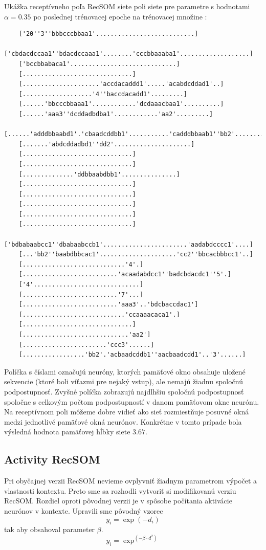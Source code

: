 Ukážka receptívneho poľa RecSOM siete poli siete pre parametre s hodnotami $\alpha = 0.35$ po poslednej trénovacej epoche na trénovacej množine :

\begin{lstlisting}
    ['20''3''bbbcccbbaa1'...........................]
    ['cbdacdccaa1''bdacdccaaa1'........'cccbbaaaba1'...................]
    ['bccbbabaca1'.............................]
    [..............................]
    [.....................'accdacaddd1'.....'acabdcddad1'..]
    [...................'4''baccdacadd1'.........]
    [......'bbcccbbaaa1'............'dcdaaacbaa1'..........]
    [......'aaa3''dcddadbdba1'............'aa2'.........]
    [......'adddbbaabd1'.'cbaadcddbb1'...........'cadddbbaab1''bb2'........]
    [.......'abdcddadbd1''dd2'.....................]
    [..............................]
    [..............................]
    [..............'ddbbaabdbb1'...............]
    [..............................]
    [..............................]
    [..............................]
    [..............................]
    [..............................]
    ['bdbabaabcc1''dbabaabccb1'.......................'aadabdcccc1'....]
    [...'bb2''baabdbbcac1'.....................'cc2''bbcacbbbcc1'..]
    [............................'4'.]
    [..........................'acaadabdcc1''badcbdacdc1''5'.]
    ['4'.............................]
    [..........................'7'...]
    [..........................'aaa3'..'bdcbaccdac1']
    [............................'ccaaaacaca1'.]
    [..............................]
    [.............................'aa2']
    [.......................'ccc3'......]
    [.................'bb2'.'acbaadcddb1''aacbaadcdd1'..'3'......]
\end{lstlisting}

Políčka s číslami označujú neuróny, ktorých pamäťové okno obsahuje uložené sekvencie (ktoré boli víťazmi pre nejaký vstup), ale nemajú žiadnu 
spoločnú podpostupnosť.
Zvyšné políčka zobrazujú najdlhšiu spoločnú podpostupnosť spoločne s celkovým počtom podpostupností 
v danom pamäťovom okne neurónu. Na receptívnom poli môžeme dobre vidieť ako sieť rozmiestňuje posuvné okná medzi jednotlivé pamäťové okná neurónov.
Konkrétne v tomto prípade bola výsledná hodnota pamäťovej hĺbky siete $3.67$.



\subsection{Activity RecSOM}
Pri obyčajnej verzii RecSOM nevieme ovplyvniť žiadnym parametrom výpočet a vlastnosti kontextu. 
Preto sme sa rozhodli vytvoriť si modifikovanú verziu RecSOM. Rozdiel oproti pôvodnej verzii je v spôsobe počítania 
aktivácie neurónov v kontexte. 
Upravili sme pôvodný vzorec 
\begin{equation}
    y_{i} = \exp{(-d_{i})}
\end{equation}
tak aby obsahoval parameter $\beta$.
\begin{equation}
    y_{i} = \exp^{(-\beta \cdot d^2)}
\end{equation}

